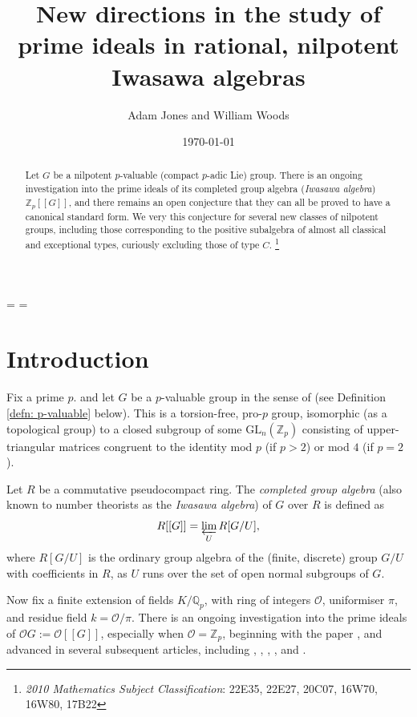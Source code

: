 \documentclass[12pt,a4paper]{article}
\theoremstyle{definition}
\theoremstyle{remark}
\theoremstyle{custthm}
\renewcommand{\O}{\mathcal{O}}
\newcommand\blfootnote[1]{%
  \begingroup
  \renewcommand\thefootnote{}\footnote{#1}%
  \addtocounter{footnote}{-1}%
  \endgroup
}
\begin{document}
\binoppenalty=\maxdimen
\relpenalty=\maxdimen

\title{New directions in the study of prime ideals in rational, nilpotent Iwasawa algebras}
\author{Adam Jones and William Woods}
\date{\today}
\maketitle
\begin{abstract}
\noindent Let $G$ be a nilpotent $p$-valuable (compact $p$-adic Lie) group. There is an ongoing investigation into the prime ideals of its completed group algebra (\emph{Iwasawa algebra}) $\mathbb{Z}_p[[G]]$, and there remains an open conjecture that they can all be proved to have a canonical standard form. We very this conjecture for several new classes of nilpotent groups, including those corresponding to the positive subalgebra of almost all classical and exceptional types, curiously excluding those of type $C$.
\blfootnote{\emph{2010 Mathematics Subject Classification}: 22E35, 22E27, 20C07, 16W70, 16W80, 17B22}
\end{abstract}

\tableofcontents

\section{Introduction}

Fix a prime $p$. and let $G$ be a $p$-valuable group in the sense of \cite{Laz65} (see Definition \ref{defn: p-valuable} below). This is a torsion-free, pro-$p$ group, isomorphic (as a topological group) to a closed subgroup of some $\mathrm{GL}_n(\mathbb{Z}_p)$ consisting of upper-triangular matrices congruent to the identity mod $p$ (if $p > 2$) or mod $4$ (if $p = 2$).

Let $R$ be a commutative pseudocompact ring. The \emph{completed group algebra} (also known to number theorists as the \emph{Iwasawa algebra}) of $G$ over $R$ is defined as
$$R[[G]] = \varprojlim_U R[G/U],$$
where $R[G/U]$ is the ordinary group algebra of the (finite, discrete) group $G/U$ with coefficients in $R$, as $U$ runs over the set of open normal subgroups of $G$.

Now fix a finite extension of fields $K/\mathbb{Q}_p$, with ring of integers $\O$, uniformiser $\pi$, and residue field $k = \O/\pi$. There is an ongoing investigation into the prime ideals of $\O G := \O[[G]]$, especially when $\O = \mathbb{Z}_p$, beginning with the paper \cite{ArdBro06}, and advanced in several subsequent articles, including \cite{reflexive}, \cite{ardakovInv}, \cite{jones-abelian-by-procyclic}, \cite{jones-primitive-ideals},\cite{Munster} and \cite{Mann}.
\end{document}
